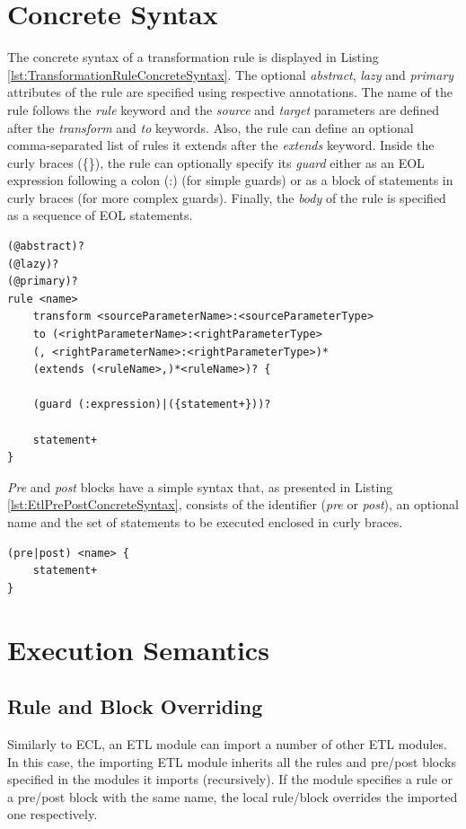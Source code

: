 \section{Concrete Syntax}

The concrete syntax of a transformation rule is displayed in Listing \ref{lst:TransformationRuleConcreteSyntax}. The optional \emph{abstract}, \emph{lazy} and \emph{primary} attributes of the rule are specified using respective annotations. The name of the rule follows the \emph{rule} keyword and the \emph{source} and \emph{target} parameters are defined after the \emph{transform} and \emph{to} keywords. Also, the rule can define an optional comma-separated list of rules it extends after the \emph{extends} keyword. Inside the curly braces (\{\}), the rule can optionally specify its \emph{guard} either as an EOL expression following a colon (:) (for simple guards) or as a block of statements in curly braces (for more complex guards). Finally, the \emph{body} of the rule is specified as a sequence of EOL statements.

\begin{lstlisting}[caption=Concrete Syntax of a TransformationRule, label=lst:TransformationRuleConcreteSyntax, language=ETL]
(@abstract)?
(@lazy)?
(@primary)?
rule <name> 
	transform <sourceParameterName>:<sourceParameterType>
	to (<rightParameterName>:<rightParameterType>
	(, <rightParameterName>:<rightParameterType>)*
	(extends (<ruleName>,)*<ruleName>)? {
	
	(guard (:expression)|({statement+}))?
	
	statement+
}
\end{lstlisting}

\emph{Pre} and \emph{post} blocks have a simple syntax that, as presented in Listing \ref{lst:EtlPrePostConcreteSyntax}, consists of the identifier (\emph{pre} or \emph{post}), an optional name and the set of statements to be executed enclosed in curly braces.

\begin{lstlisting}[caption=Concrete Syntax of Pre and Post blocks, label=lst:EtlPrePostConcreteSyntax, language=ETL]
(pre|post) <name> {
	statement+
}
\end{lstlisting}

\section{Execution Semantics}
\label{sec:ETL.ExecutionSemantics}

\subsection{Rule and Block Overriding}
Similarly to ECL, an ETL module can import a number of other ETL modules. In this case, the importing ETL module inherits all the rules and pre/post blocks specified in the modules it imports (recursively). If the module specifies a rule or a pre/post block with the same name, the local rule/block overrides the imported one respectively.

